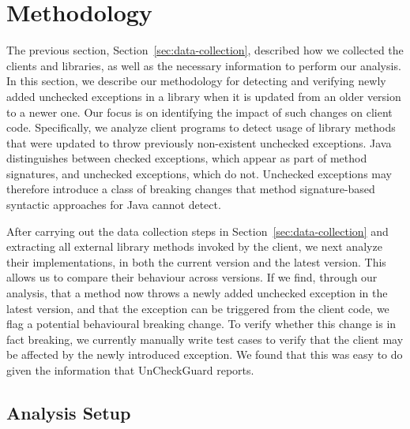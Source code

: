 \chapter{Methodology}
The previous section, Section~\ref{sec:data-collection}, described how we collected the clients and libraries, as well as the necessary information to perform our analysis.
In this section, we describe our methodology for detecting and verifying newly added unchecked exceptions in a library when it is updated from an older version to a newer one. Our focus is on identifying the impact of such changes on client code. Specifically, we analyze client programs to detect usage of library methods that were updated to throw previously non-existent unchecked exceptions. Java distinguishes between checked exceptions, which appear as part of method signatures, and unchecked exceptions, which do not. Unchecked exceptions may therefore introduce a class of breaking changes that method signature-based syntactic approaches for Java cannot detect.

After carrying out the data collection steps in Section~\ref{sec:data-collection} and extracting all external library methods invoked by the client, we next analyze their implementations, in both the current version and the latest version. This allows us to compare their behaviour across versions. If we find, through our analysis, that a method now throws a newly added unchecked exception in the latest version, and that the exception can be triggered from the client code, we flag a potential behavioural breaking change. To verify whether this change is in fact breaking, we currently manually write test cases to verify that the client may be affected by the newly introduced exception. We found that this was easy to do given the information that UnCheckGuard reports.

\section{Analysis Setup}

